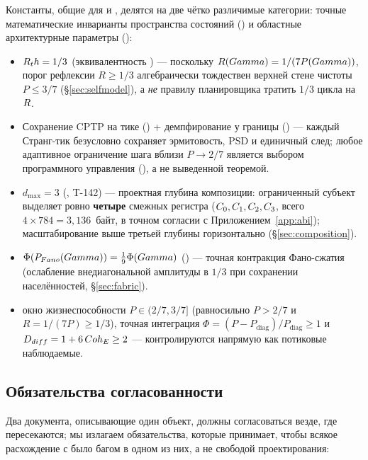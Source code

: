 Константы, общие для \SYNARC{} и \TALOS{}, делятся на две чётко различимые
категории: точные математические инварианты пространства состояний ()
и областные архитектурные параметры ():

\begin{itemize}[leftmargin=1.5em,itemsep=1pt]
  \item $R_th=1/3$ (эквивалентность ) --- поскольку
        $R(Gamma)=1/(7P(Gamma))$, порог рефлексии $R\ge 1/3$ алгебраически
        тождествен верхней стене чистоты $P\le 3/7$ (\S\ref{sec:selfmodel}), а
        \emph{не} правилу планировщика тратить $1/3$ цикла на $R$.
  \item Сохранение CPTP на тике () + демпфирование у границы
        () --- каждый Странг-тик безусловно сохраняет эрмитовость,
        PSD и единичный след; любое адаптивное ограничение шага вблизи
        $P\to 2/7$ является выбором программного управления (), а не
        выведенной теоремой.
  \item $d_{\max}=3$ (, T-142) --- проектная глубина композиции:
        ограниченный субъект выделяет ровно \textbf{четыре} смежных регистра
        \DM{} ($C_0,C_1,C_2,C_3$, всего $4\times 784=3{,}136$~байт,
        в точном согласии с Приложением~\ref{app:abi}); масштабирование выше
        третьей глубины горизонтально (\S\ref{sec:composition}).
  \item $\Phi(P_{Fano}(Gamma))=\tfrac{1}{9}\Phi(Gamma)$
        () --- точная контракция Фано-сжатия (ослабление
        внедиагональной амплитуды в $1/3$ при сохранении населённостей,
        \S\ref{sec:fabric}).
  \item окно жизнеспособности $P\in(2/7,3/7]$ (равносильно $P>2/7$ и
        $R=1/(7P)\ge 1/3$), точная интеграция
        $\Phi=(P-P_{\mathrm{diag}})/P_{\mathrm{diag}}\ge 1$ и
        $D_{diff}=1+6\,Coh_E\ge 2$ --- контролируются напрямую как
        потиковые наблюдаемые.
\end{itemize}

\subsection{Обязательства согласованности}

Два документа, описывающие один объект, должны согласоваться везде, где
пересекаются; мы излагаем обязательства, которые \TALOS{} принимает, чтобы всякое
расхождение с \SYNARC{} было багом в одном из них, а не свободой проектирования:


